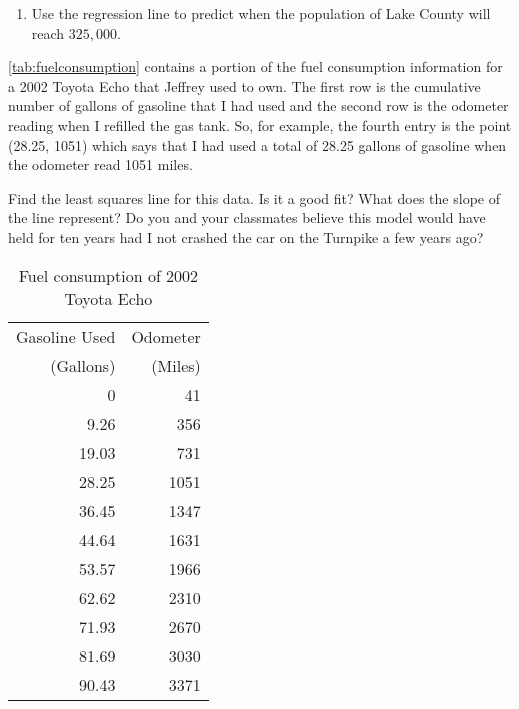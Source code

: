 \begin{exenum}
\begin{enumerate}
\item  Use the regression line to predict when the population of Lake County will reach $325,\!000$.

\end{enumerate}

\item \autoref{tab:fuelconsumption} contains a portion of the fuel consumption information for a 2002 Toyota Echo that Jeffrey used to own.  The first row is the cumulative number of gallons of gasoline that I had used and the second row is the odometer reading when I refilled the gas tank.  So, for example, the fourth entry is the point (28.25, 1051) which says that I had used a total of 28.25 gallons of gasoline when the odometer read 1051 miles.

Find the least squares line for this data.  Is it a good fit?  What does the slope of the line represent?  Do you and your classmates believe this model would have held for ten years had I not crashed the car on the Turnpike a few years ago?

\end{exenum}

\begin{table}
\begin{center}

\begin{tabular}{|r|r|} \hline
Gasoline Used & Odometer\\
(Gallons) & (Miles)\\
\hline
0 & 41 \\
\hline
9.26 & 356 \\
\hline
19.03 & 731 \\
\hline
28.25 & 1051 \\
\hline
36.45 & 1347 \\
\hline
44.64 & 1631 \\
\hline
53.57 & 1966 \\
\hline
62.62 & 2310 \\
\hline
71.93 & 2670 \\
\hline
81.69 & 3030 \\
\hline
90.43 & 3371 \\
\hline
\end{tabular}

\caption{Fuel consumption of 2002 Toyota Echo}
\label{tab:fuelconsumption}
\end{center}
\end{table}


